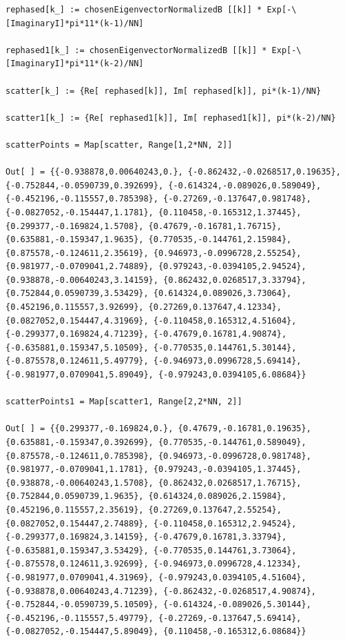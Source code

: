 \begin{lstlisting}
rephased[k_] := chosenEigenvectorNormalizedB [[k]] * Exp[-\[ImaginaryI]*pi*11*(k-1)/NN]

rephased1[k_] := chosenEigenvectorNormalizedB [[k]] * Exp[-\[ImaginaryI]*pi*11*(k-2)/NN]

scatter[k_] := {Re[ rephased[k]], Im[ rephased[k]], pi*(k-1)/NN}

scatter1[k_] := {Re[ rephased1[k]], Im[ rephased1[k]], pi*(k-2)/NN}

scatterPoints = Map[scatter, Range[1,2*NN, 2]]

Out[ ] = {{-0.938878,0.00640243,0.}, {-0.862432,-0.0268517,0.19635}, {-0.752844,-0.0590739,0.392699}, {-0.614324,-0.089026,0.589049}, {-0.452196,-0.115557,0.785398}, {-0.27269,-0.137647,0.981748}, {-0.0827052,-0.154447,1.1781}, {0.110458,-0.165312,1.37445}, {0.299377,-0.169824,1.5708}, {0.47679,-0.16781,1.76715}, {0.635881,-0.159347,1.9635}, {0.770535,-0.144761,2.15984}, {0.875578,-0.124611,2.35619}, {0.946973,-0.0996728,2.55254}, {0.981977,-0.0709041,2.74889}, {0.979243,-0.0394105,2.94524}, {0.938878,-0.00640243,3.14159}, {0.862432,0.0268517,3.33794}, {0.752844,0.0590739,3.53429}, {0.614324,0.089026,3.73064}, {0.452196,0.115557,3.92699}, {0.27269,0.137647,4.12334}, {0.0827052,0.154447,4.31969}, {-0.110458,0.165312,4.51604}, {-0.299377,0.169824,4.71239}, {-0.47679,0.16781,4.90874}, {-0.635881,0.159347,5.10509}, {-0.770535,0.144761,5.30144}, {-0.875578,0.124611,5.49779}, {-0.946973,0.0996728,5.69414}, {-0.981977,0.0709041,5.89049}, {-0.979243,0.0394105,6.08684}}

scatterPoints1 = Map[scatter1, Range[2,2*NN, 2]]

Out[ ] = {{0.299377,-0.169824,0.}, {0.47679,-0.16781,0.19635}, {0.635881,-0.159347,0.392699}, {0.770535,-0.144761,0.589049}, {0.875578,-0.124611,0.785398}, {0.946973,-0.0996728,0.981748}, {0.981977,-0.0709041,1.1781}, {0.979243,-0.0394105,1.37445}, {0.938878,-0.00640243,1.5708}, {0.862432,0.0268517,1.76715}, {0.752844,0.0590739,1.9635}, {0.614324,0.089026,2.15984}, {0.452196,0.115557,2.35619}, {0.27269,0.137647,2.55254}, {0.0827052,0.154447,2.74889}, {-0.110458,0.165312,2.94524}, {-0.299377,0.169824,3.14159}, {-0.47679,0.16781,3.33794}, {-0.635881,0.159347,3.53429}, {-0.770535,0.144761,3.73064}, {-0.875578,0.124611,3.92699}, {-0.946973,0.0996728,4.12334}, {-0.981977,0.0709041,4.31969}, {-0.979243,0.0394105,4.51604}, {-0.938878,0.00640243,4.71239}, {-0.862432,-0.0268517,4.90874}, {-0.752844,-0.0590739,5.10509}, {-0.614324,-0.089026,5.30144}, {-0.452196,-0.115557,5.49779}, {-0.27269,-0.137647,5.69414}, {-0.0827052,-0.154447,5.89049}, {0.110458,-0.165312,6.08684}}
\end{lstlisting}

